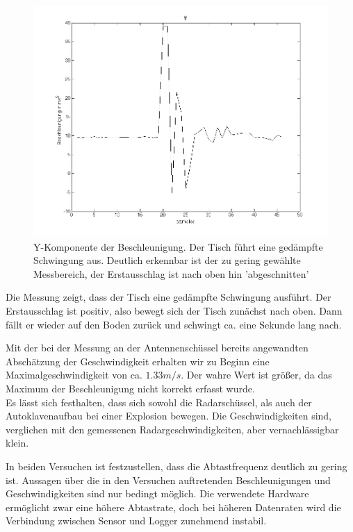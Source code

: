 \documentclass[12pt,a4paper,twoside,BCOR=12.5mm]{scrartcl}
\begin{document}
\begin{figure}[H]
\centering
\includegraphics[scale=.5]{wakiki/tischmovement_y.png}
\caption{Y-Komponente der Beschleunigung. Der Tisch führt eine gedämpfte Schwingung aus. Deutlich erkennbar ist der zu gering gewählte Messbereich, der Erstausschlag ist nach oben hin 'abgeschnitten'}
\label{tischmovement_y}
\end{figure}

Die Messung zeigt, dass der Tisch eine gedämpfte Schwingung ausführt. Der Erstausschlag ist positiv, also bewegt sich der Tisch zunächst nach oben. Dann fällt er wieder auf den Boden zurück und schwingt ca.  eine Sekunde lang nach.

Mit der bei der Messung an der Antennenschüssel bereits angewandten Abschätzung der Geschwindigkeit erhalten wir zu Beginn eine Maximalgeschwindigkeit von ca. $1.33 m/s$. Der wahre Wert ist größer, da das Maximum der Beschleunigung nicht korrekt erfasst wurde. \\


Es lässt sich festhalten, dass sich sowohl die Radarschüssel, als auch der Autoklavenaufbau bei einer Explosion bewegen. Die Geschwindigkeiten sind, verglichen mit den gemessenen Radargeschwindigkeiten, aber vernachlässigbar klein.

In beiden Versuchen ist festzustellen, dass die Abtastfrequenz deutlich zu gering ist. Aussagen über die in den Versuchen auftretenden Beschleunigungen und Geschwindigkeiten sind nur bedingt möglich. Die verwendete Hardware ermöglicht zwar eine höhere Abtastrate, doch bei höheren Datenraten wird die Verbindung zwischen Sensor und Logger zunehmend instabil.
\end{document}
